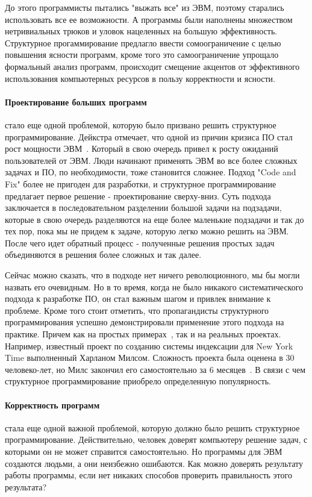До этого программисты пытались "выжать все" из ЭВМ, поэтому старались использовать все ее возможности. А программы были наполнены множеством нетривиальных трюков и уловок нацеленных на большую эффективность. Структурное прогаммирование предлагло ввести сомоограничение с целью повышения ясности программ, кроме того это самоограничение упрощало формальный анализ программ, происходит смещение акцентов от эффективного использования компьютерных ресурсов в пользу корректности и ясности.

\paragraph{Проектирование больших программ} стало еще одной проблемой, которую было призвано решить структурное программирование. Дейкстра отмечает, что одной из причин кризиса ПО стал рост мощности ЭВМ~\cite{Dijkstra:1972:HP}. Который в свою очередь привел к росту ожиданий пользователей от ЭВМ. Люди начинают применять ЭВМ во все более сложных задачах и ПО, по необходимости, тоже становится сложнее. Подход "Code and Fix" более не пригоден для разработки, и структурное программирование предлагает первое решение - проектирование сверху-вниз. Суть подхода заключается в последовательном разделении большой задачи на подзадачи, которые в свою очередь разделяются на еще более маленькие подзадачи и так до тех пор, пока мы не придем к задаче, которую легко можно решить на ЭВМ. После чего идет обратный процесс - полученные решения простых задач объединяются в решения более сложных и так далее.

Сейчас можно сказать, что в подходе нет ничего революционного, мы бы могли назвать его очевидным. Но в то время, когда не было никакого систематического подхода к разработке ПО, он стал важным шагом и привлек внимание к проблеме. Кроме того стоит отметить, что пропагандисты структурного программирования успешно демонстрировали применение этого подхода на практике. Причем как на простых примерах~\cite{Wirth:1971:PDS}, так и на реальных проектах. Например, известный проект по созданию системы индексации для New York Time выполненный Харланом Милсом. Сложность проекта была оценена в 30 человеко-лет, но Милс закончил его самостоятельно за 6 месяцев~\cite{Aron:1979:SP}. В связи с чем структурное программирование приобрело определенную популярность.

\paragraph{Корректность программ} стала еще одной важной проблемой, которую должно было решить структурное программирование. Действительно, человек доверят компьютеру решение задач, с которыми он не может справится самостоятельно. Но программы для ЭВМ создаются людьми, а они неизбежно ошибаются. Как можно доверять результату работы программы, если нет никаких способов проверить правильность этого результата?

